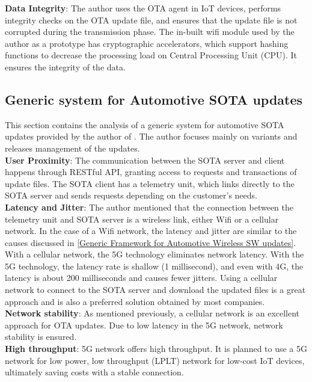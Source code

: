 \documentclass[12pt,a4paper]{article}
\begin{document}
{\textbf{Data Integrity}: The author uses the OTA agent in IoT devices, performs integrity checks on the OTA update file, and ensures that the update file is not corrupted during the transmission phase. The in-built wifi module used by the author as a prototype has cryptographic accelerators, which support hashing functions to decrease the processing load on Central Processing Unit (CPU). It ensures the integrity of the data. \cite{r27} \\

\subsection{Generic system for Automotive SOTA updates}

This section contains the analysis of a generic system for automotive SOTA updates provided by the author of \cite{r28}. The author focuses mainly on variants and releases management of the updates. \\

\textbf{User Proximity}: The communication between the SOTA server and client happens through RESTful API, granting access to requests and transactions of update files. The SOTA client has a telemetry unit, which links directly to the SOTA server and sends requests depending on the customer's needs. \cite{r28} \\

\textbf{Latency and Jitter}: The author mentioned that the connection between the telemetry unit and SOTA server is a wireless link, either Wifi or a cellular network. In the case of a Wifi network, the latency and jitter are similar to the causes discussed in \ref{Generic Framework for Automotive Wireless SW updates}. With a cellular network, the 5G technology eliminates network latency. With the 5G technology, the latency rate is shallow (1 millisecond), and even with 4G, the latency is about 200 milliseconds and causes fewer jitters. Using a cellular network to connect to the SOTA server and download the updated files is a great approach and is also a preferred solution obtained by most companies. \cite{r33} \cite{r28} \\

\textbf{Network stability}: As mentioned previously, a cellular network is an excellent approach for OTA updates. Due to low latency in the 5G network, network stability is ensured. \cite{r33} \cite{r28} \\

\textbf{High throughput}: 5G network offers high throughput. It is planned to use a 5G network for low power, low throughput (LPLT) network for low-cost IoT devices, ultimately saving costs with a stable connection. \cite{r33} \cite{r28} \\

}
\end{document}
